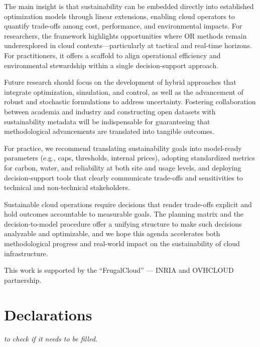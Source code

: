 \documentclass[pdflatex,sn-mathphys-num]{sn-jnl}
\theoremstyle{thmstyleone}
\theoremstyle{thmstyletwo}
\theoremstyle{thmstylethree}
\begin{document}
The main insight is that sustainability can be embedded directly into established optimization models through linear extensions, enabling cloud operators to quantify trade-offs among cost, performance, and environmental impacts. For researchers, the framework highlights opportunities where OR methods remain underexplored in cloud contexts—particularly at tactical and real-time horizons. For practitioners, it offers a scaffold to align operational efficiency and environmental stewardship within a single decision-support approach.

Future research should focus on the development of hybrid approaches that integrate optimization, simulation, and control, as well as the advancement of robust and stochastic formulations to address uncertainty. Fostering collaboration between academia and industry and constructing open datasets with sustainability metadata will be indispensable for guaranteeing that methodological advancements are translated into tangible outcomes. 

For practice, we recommend translating sustainability goals into model-ready parameters (e.g., caps, thresholds, internal prices), adopting standardized metrics for carbon, water, and reliability at both site and usage levels, and deploying decision-support tools that clearly communicate trade-offs and sensitivities to technical and non-technical stakeholders.

Sustainable cloud operations require decisions that render trade-offs explicit and hold outcomes accountable to measurable goals. The planning matrix and the decision-to-model procedure offer a unifying structure to make such decisions analyzable and optimizable, and we hope this agenda accelerates both methodological progress and real-world impact on the sustainability of cloud infrastructure.


\backmatter

This work is supported by the “FrugalCloud” — INRIA and OVHCLOUD partnership.

\section*{Declarations}
\textit{to check if it needs to be filled.}


\end{document}
